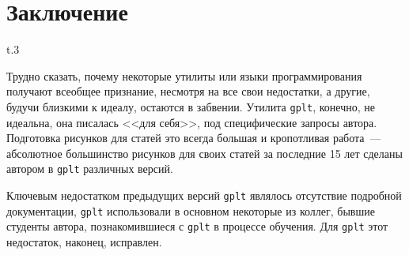 \documentclass[12pt]{article}
\def\gplt{{\tt gplt}}
\begin{document}

\section{Заключение}
\begin{wrapfigure}[7]{t}{.3\textwidth}
  \vphantom{.}

  \vspace{-2.3cm}
\end{wrapfigure}

Трудно сказать, почему некоторые утилиты или языки программирования получают всеобщее признание, несмотря на все свои недостатки,
а другие, будучи близкими к идеалу, остаются в забвении. 
Утилита \gplt{}, конечно, не идеальна, она писалась <<для себя>>, под специфические запросы автора.
Подготовка рисунков для статей это всегда большая и кропотливая работа~---
абсолютное большинство рисунков для своих статей за последние 15 лет сделаны автором в \verb'gplt' различных версий.

Ключевым недостатком предыдущих версий \verb'gplt' являлось отсутствие подробной документации,
\verb'gplt' использовали в основном некоторые из коллег, бывшие студенты автора, познакомившиеся с \verb'gplt'
в процессе обучения. Для \gplt{}  этот недостаток, наконец, исправлен. 



\end{document}
